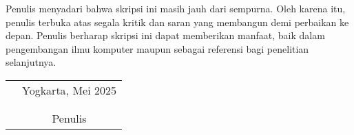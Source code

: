 Penulis menyadari bahwa skripsi ini masih jauh dari sempurna. Oleh karena itu, penulis terbuka atas segala kritik dan saran yang membangun demi perbaikan ke depan. Penulis berharap skripsi ini dapat memberikan manfaat, baik dalam pengembangan ilmu komputer maupun sebagai referensi bagi penelitian selanjutnya.

\vspace{1.5cm}
\begin{tabular}{p{7.5cm}c}
&Yogkarta, Mei 2025\\
&\\
&\\
&\space Penulis
\end{tabular}
\vfill
